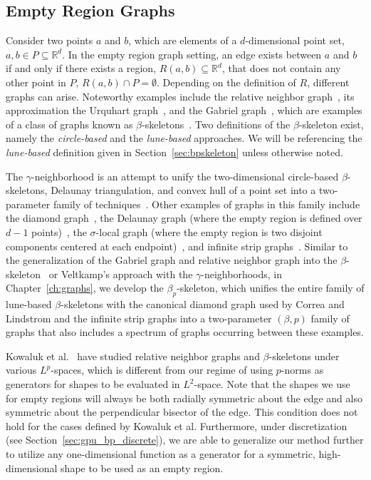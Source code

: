 \subsection{Empty Region Graphs}
Consider two points $a$ and $b$, which are elements of a $d$-dimensional point set, $a,b \in P \subseteq \mathbb{R}^d$.
%
In the empty region graph setting, an edge exists between $a$ and $b$ if and only if there exists a region, $R(a,b) \subseteq \mathbb{R}^d$, that does not contain any other point in $P$, $R(a,b) \cap P = \emptyset$.
%
Depending on the definition of $R$, different graphs can arise.
%
Noteworthy examples include the relative neighbor graph~\cite{Toussaint1980}, its approximation the Urquhart graph~\cite{Urquhart1980}, and the Gabriel graph~\cite{GabrielSokal1969}, which are examples of a class of graphs known as $\beta$-skeletons~\cite{KirkpatrickRadke1985,JaromczykToussaint1992}.
%
Two definitions of the $\beta$-skeleton exist, namely the \emph{circle-based} and the \emph{lune-based} approaches.
%
We will be referencing the \emph{lune-based} definition given in Section~\ref{sec:bpskeleton} unless otherwise noted.

The $\gamma$-neighborhood is an attempt to unify the two-dimensional circle-based $\beta$-skeletons, Delaunay triangulation, and convex hull of a point set into a two-parameter family of techniques~\cite{Veltkamp1991}.
%
Other examples of graphs in this family include the diamond graph~\cite{CorreaLindstrom2011}, the Delaunay graph (where the empty region is defined over $d-1$ points)~\cite{Delaunay1934}, the $\sigma$-local graph (where the empty region is two disjoint components centered at each endpoint)~\cite{BoseColletteLangerman2010}, and infinite strip graphs~\cite{Veltkamp1991,CardinalColletteLangerman2009}.
%
Similar to the generalization of the Gabriel graph and relative neighbor graph into the $\beta$-skeleton~\cite{KirkpatrickRadke1985} or Veltkamp's approach with the $\gamma$-neighborhoods, in Chapter~\ref{ch:graphs}, we develop the $\beta_p$-skeleton, which unifies the entire family of lune-based $\beta$-skeletons with the canonical diamond graph used by Correa and Lindstrom and the infinite strip graphs into a two-parameter $(\beta,p)$ family of graphs that also includes a spectrum of graphs occurring between these examples.

Kowaluk et al.~\cite{JaromczykKowaluk1987,KowalukMajewska2014} have studied relative neighbor graphs and $\beta$-skeletons under various $L^p$-spaces, which is different from our regime of using $p$-norms as generators for shapes to be evaluated in $L^2$-space.
%
Note that the shapes we use for empty regions will always be both radially symmetric about the edge and also symmetric about the perpendicular bisector of the edge.
%
This condition does not hold for the cases defined by Kowaluk et al.
%
Furthermore, under discretization (see Section~\ref{sec:gpu_bp_discrete}), we are able to generalize our method further to utilize any one-dimensional function as a generator for a symmetric, high-dimensional shape to be used as an empty region.

